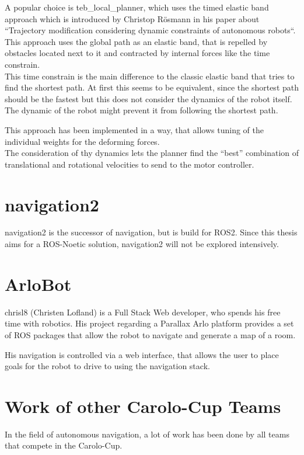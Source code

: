 A popular choice is teb\_local\_planner, which uses the timed elastic band approach which is introduced by Christop Rösmann in his paper about ``Trajectory modification considering dynamic constraints of autonomous robots``.\\
This approach uses the global path as an elastic band, that is repelled by obstacles located next to it and contracted by internal forces like the time constrain.\\
This time constrain is the main difference to the classic elastic band that tries to find the shortest path. At first this seems to be equivalent, since the shortest path should be the fastest but this does not consider the dynamics of the robot itself. 
The dynamic of the robot might prevent it from following the shortest path\cite{Rsmann2012TrajectoryMC}. 

This approach has been implemented in a way, that allows tuning of the individual weights for the deforming forces.\\

The consideration of thy dynamics lets the planner find the ``best'' combination of translational and rotational velocities to send to the motor controller.
\section{navigation2}

navigation2 is the successor of navigation, but is build for ROS2.
Since this thesis aims for a ROS-Noetic solution, navigation2 will not be explored intensively.

\section{ArloBot}
chrisl8 (Christen Lofland) is a Full Stack Web developer, who spends his free time with robotics. His project regarding a Parallax Arlo platform provides a set of ROS packages that allow the robot to navigate and generate a map of a room\cite{chrisl8}.

His navigation is controlled via a web interface, that allows the user to place goals for the robot to drive to using the navigation stack.

\section{Work of other Carolo-Cup Teams}
In the field of autonomous navigation, a lot of work has been done by all teams that compete in the Carolo-Cup.\\

